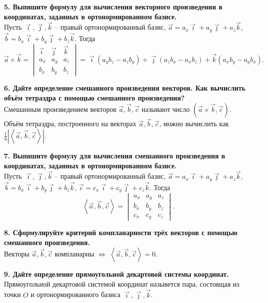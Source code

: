\documentclass[11pt,a4paper]{article}
\newcommand{\I}{\imath}
\newcommand{\J}{\jmath}
\newcommand{\vect}[1]{\overrightarrow{#1}}
\begin{document}
\textbf{5. Выпишите формулу для вычисления векторного произведения в координатах, заданных в ортонормированном базисе.\\}
Пусть $\vect{\I}, \vect{\J}, \vect{k}$ -- правый ортонормированный базис, $\vect{a} = a_x \vect{\I} + a_y \vect{\J} + a_z \vect{k}$, $\vect{b} = b_x \vect{\I} + b_y \vect{\J} + b_z \vect{k}$. Тогда $$\vect{a} \times \vect{b} =
\begin{vmatrix}
\vect{\I} & \vect{\J} & \vect{k} \\
a_x & a_y & a_z \\
b_x & b_y & b_z
\end{vmatrix} =
\vect{\I} \left( a_y b_z - a_z b_y \right) + \vect{\J} \left( a_z b_x - a_x b_z \right) + \vect{k} \left( a_x b_y - a_y b_x \right).$$

\textbf{6. Дайте определение смешанного произведения векторов. Как вычислить объём тетраэдра с помощью смешанного произведения?\\}
Смешанным произведением векторов $\vect{a}, \vect{b}, \vect{c}$ называют число $\left( \vect{a} \times \vect{b}, \vect{c} \right)$.\\
Объём тетраэдра, построенного на векторах $\vect{a}, \vect{b}, \vect{c}$, можно вычислить как $\frac{1}{6} \left\lvert \left\langle \vect{a}, \vect{b}, \vect{c} \right\rangle \right\rvert$.

\textbf{7. Выпишите формулу для вычисления смешанного произведения в координатах, заданных в ортонормированном базисе.\\}
Пусть $\vect{\I}, \vect{\J}, \vect{k}$ -- правый ортонормированный базис, $\vect{a} = a_x \vect{\I} + a_y \vect{\J} + a_z \vect{k}$, $\vect{b} = b_x \vect{\I} + b_y \vect{\J} + b_z \vect{k}$, $\vect{c} = c_x \vect{\I} + c_y \vect{\J} + c_z \vect{k}$. Тогда
$$\left\langle \vect{a}, \vect{b}, \vect{c} \right\rangle =
\begin{vmatrix}
a_x & a_y & a_z \\
b_x & b_y & b_z \\
c_x & c_y & c_z
\end{vmatrix}.$$

\textbf{8. Сформулируйте критерий компланарности трёх векторов с помощью смешанного произведения.\\}
Векторы $\vect{a}, \vect{b}, \vect{c}$ компланарны $\Leftrightarrow$ $\left\langle \vect{a}, \vect{b}, \vect{c} \right\rangle = 0$.

\textbf{9. Дайте определение прямоугольной декартовой системы координат.\\}
Прямоугольной декартовой системой координат назывется пара, состоящая из точки $O$ и ортонормированного базиса $\vect{\I}, \vect{\J}, \vect{k}$.
\end{document}
